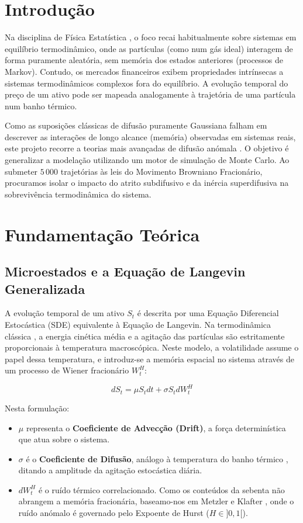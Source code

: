 \documentclass[11pt, a4paper]{article}
\begin{document}
\vspace{0.5cm}

\section{Introdução}
Na disciplina de Física Estatística \cite{sebenta}, o foco recai habitualmente sobre sistemas em equilíbrio termodinâmico, onde as partículas (como num gás ideal) interagem de forma puramente aleatória, sem memória dos estados anteriores (processos de Markov). Contudo, os mercados financeiros exibem propriedades intrínsecas a sistemas termodinâmicos complexos fora do equilíbrio. A evolução temporal do preço de um ativo pode ser mapeada analogamente à trajetória de uma partícula num banho térmico. 

Como as suposições clássicas de difusão puramente Gaussiana falham em descrever as interações de longo alcance (memória) observadas em sistemas reais, este projeto recorre a teorias mais avançadas de difusão anómala \cite{metzler}. O objetivo é generalizar a modelação utilizando um motor de simulação de Monte Carlo. Ao submeter $5\,000$ trajetórias às leis do Movimento Browniano Fracionário, procuramos isolar o impacto do atrito subdifusivo e da inércia superdifusiva na sobrevivência termodinâmica do sistema.

\section{Fundamentação Teórica}

\subsection{Microestados e a Equação de Langevin Generalizada}
A evolução temporal de um ativo $S_t$ é descrita por uma Equação Diferencial Estocástica (SDE) equivalente à Equação de Langevin. Na termodinâmica clássica \cite{sebenta}, a energia cinética média e a agitação das partículas são estritamente proporcionais à temperatura macroscópica. Neste modelo, a volatilidade assume o papel dessa temperatura, e introduz-se a memória espacial no sistema através de um processo de Wiener fracionário $W_t^H$:

\begin{equation}
dS_t = \mu S_t dt + \sigma S_t dW_t^H
\end{equation}

Nesta formulação:
\begin{itemize}
    \item $\mu$ representa o \textbf{Coeficiente de Advecção (Drift)}, a força determinística que atua sobre o sistema.
    \item $\sigma$ é o \textbf{Coeficiente de Difusão}, análogo à temperatura do banho térmico \cite{sebenta}, ditando a amplitude da agitação estocástica diária.
    \item $dW_t^H$ é o ruído térmico correlacionado. Como os conteúdos da sebenta não abrangem a memória fracionária, baseamo-nos em Metzler e Klafter \cite{metzler}, onde o ruído anómalo é governado pelo Expoente de Hurst ($H \in ]0, 1[$).
\end{itemize}
\end{document}
